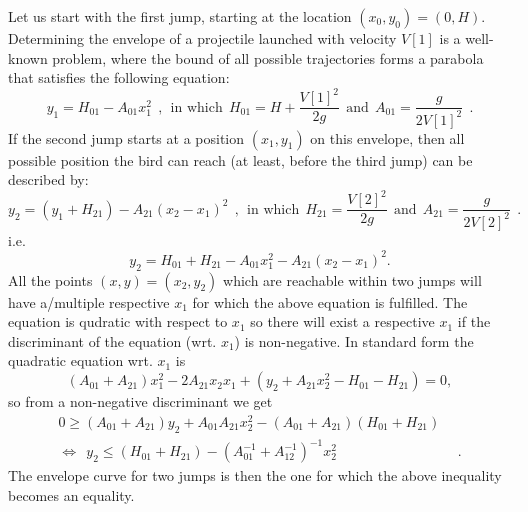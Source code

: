 \begin{solution}
Let us start with the first jump, starting at the location $(x_0,y_0)=(0,H)$. Determining the envelope of a projectile launched with velocity
$V[1]$ is a well-known problem, where the bound of all possible trajectories forms a parabola that satisfies the following equation:
\begin{equation}
y_1 = H_{01} - A_{01}x_1^2  \ \ , \ \ \text{in which} \ \  H_{01}=H+\frac{V[1]^2}{2g}  \ \ \text{and} \ \ A_{01}=\frac{g}{2V[1]^2} \ \ .
\end{equation}
If the second jump starts at a position $(x_1,y_1)$ on this envelope, then all possible position the bird can reach (at least, before the third jump) can be described by:
\begin{equation}
y_2 = \left(y_1 + H_{21} \right) - A_{21}\left(x_2-x_1\right)^2 \ \ , \ \ \text{in which} \ \  H_{21}=\frac{V[2]^2}{2g}  \ \ \text{and} \ \ A_{21}=\frac{g}{2V[2]^2} \ \ .
\end{equation}
i.e.
\[y_2=H_{01}+H_{21}-A_{01}x_1^2-A_{21}(x_2-x_1)^2.\]
All the points $(x,y)=(x_2,y_2)$ which are reachable within two jumps will have a/multiple respective $x_1$ for which the above equation is fulfilled. The equation is qudratic with respect to $x_1$ so there will exist a respective $x_1$ if the discriminant of the equation (wrt. $x_1$) is non-negative. In standard form the quadratic equation wrt. $x_1$ is
\[(A_{01}+A_{21})x_1^2-2A_{21}x_2x_1+(y_2+A_{21}x_2^2-H_{01}-H_{21})=0,\]
so from a non-negative discriminant we get
\begin{equation}
\begin{split}
0 \geq(A_{01}+A_{21})y_2+A_{01}A_{21}x_2^2-(A_{01}+A_{21})(H_{01}+H_{21}) &
\\
\Longleftrightarrow \ \ y_2 \leq (H_{01}+H_{21})-\left(A_{01}^{-1}+A_{12}^{-1}\right)^{-1}x_2^2 & \ \ .
\end{split}
\end{equation}
The envelope curve for two jumps is then the one for which the above inequality becomes an equality.\\


\end{solution}
